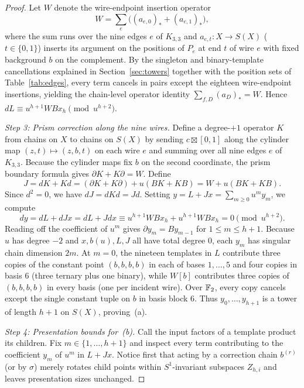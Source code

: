 \begin{proof}
Let $W$ denote the wire-endpoint insertion operator
\[
 W=\sum_{e}\big((a_{e,0})_*+(a_{e,1})_*\big),
\]
where the sum runs over the nine edges $e$ of $K_{3,3}$ and $a_{e,t}:X\to S(X)$ ($t\in\{0,1\}$) inserts its argument on the positions of $P_e$ at end $t$ of wire $e$ with fixed background $b$ on the complement. By the singleton and binary-template cancellations explained in Section~\ref{sec:towers} together with the position sets of Table~\ref{tab:edges}, every term cancels in pairs except the eighteen wire-endpoint insertions, yielding the chain-level operator identity $\sum_{f,D}(a_D)_*=W$. Hence $dL\equiv u^{h+1}WBx_h\pmod{u^{h+2}}$.

\emph{Step 3: Prism correction along the nine wires.} Define a degree-$+1$ operator $K$ from chains on $X$ to chains on $S(X)$ by sending $c\boxtimes[0,1]$ along the cylinder map $(z,t)\mapsto(z,b,t)$ on each wire $e$ and summing over all nine edges $e$ of $K_{3,3}$. Because the cylinder maps fix $b$ on the second coordinate, the prism boundary formula gives $\partial K+K\partial=W$. Define
\[
 J=dK+Kd=(\partial K+K\partial)+u(BK+KB)=W+u(BK+KB).
\]
Since $d^2=0$, we have $dJ=dKd=Jd$. Setting $y=L+Jx=\sum_{m\ge0} u^m y_m$, we compute
\[
 dy=dL+dJx=dL+Jdx\equiv u^{h+1}WBx_h+u^{h+1}WBx_h=0 \pmod{u^{h+2}}.
\]
Reading off the coefficient of $u^m$ gives $\partial y_m=By_{m-1}$ for $1\le m\le h+1$. Because $u$ has degree $-2$ and $x,b(u),L,J$ all have total degree $0$, each $y_m$ has singular chain dimension $2m$. At $m=0$, the nineteen templates in $L$ contribute three copies of the constant point $(b,b,b,b)$ in each of bases $1,\ldots,5$ and four copies in basis $6$ (three ternary plus one binary), while $W[b]$ contributes three copies of $(b,b,b,b)$ in every basis (one per incident wire). Over $\mathbb F_2$, every copy cancels except the single constant tuple on $b$ in basis block $6$. Thus $y_0,\ldots,y_{h+1}$ is a tower of length $h+1$ on $S(X)$, proving~(a).

\emph{Step 4: Presentation bounds for~(b).} Call the input factors of a template product its children. Fix $m\in\{1,\ldots,h+1\}$ and inspect every term contributing to the coefficient $y_m$ of $u^m$ in $L+Jx$. Notice first that acting by a correction chain $b^{(r)}$ (or by $\sigma$) merely rotates child points within $S^1$-invariant subspaces $Z_{h,i}$ and leaves presentation sizes unchanged.


\end{proof}
